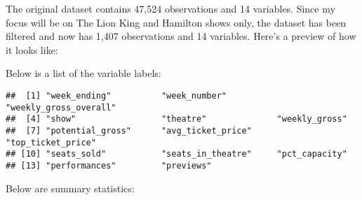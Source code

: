 \documentclass[
]{article}
\begin{document}
The original dataset contains 47,524 observations and 14 variables. Since my focus will be on The Lion King and Hamilton shows only, the dataset has been filtered and now has 1,407 observations and 14 variables. Here's a preview of how it looks like:

\begin{table}

\caption{\label{tab:previewofdataset}}
\centering
{}
\end{table}

Below is a list of the variable labels:

\begin{verbatim}
##  [1] "week_ending"          "week_number"          "weekly_gross_overall"
##  [4] "show"                 "theatre"              "weekly_gross"        
##  [7] "potential_gross"      "avg_ticket_price"     "top_ticket_price"    
## [10] "seats_sold"           "seats_in_theatre"     "pct_capacity"        
## [13] "performances"         "previews"
\end{verbatim}

Below are summary statistics:
\end{document}
